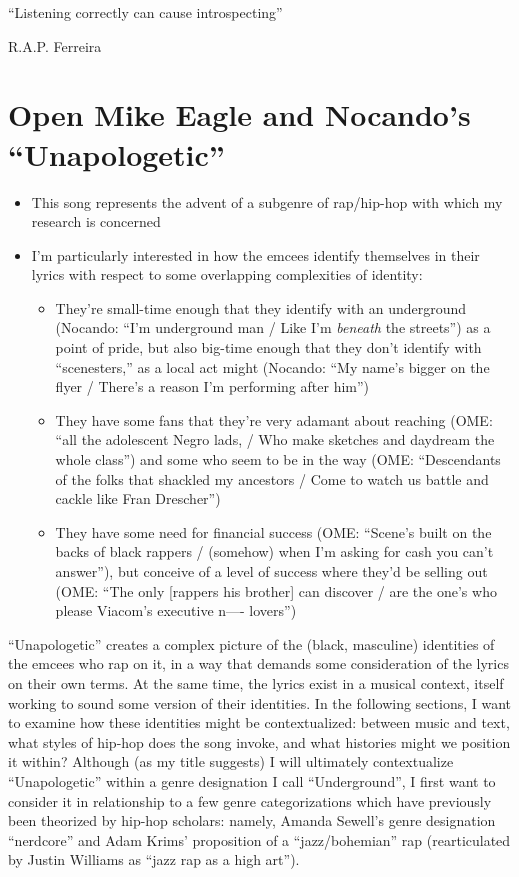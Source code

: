 \onehalfspacing

\epigraph{{``Listening correctly can cause introspecting''}}{R.A.P. Ferreira}

\section{Open Mike Eagle and Nocando's ``Unapologetic''}

\begin{itemize}
    \item This song represents the advent of a subgenre of rap/hip-hop with which my research is concerned
    \item I'm particularly interested in how the emcees identify themselves in their lyrics with respect to some 
    overlapping complexities of identity:
          \begin{itemize}
                \item They're small-time enough that they identify with an underground (Nocando: ``I'm underground man / Like 
                I'm  \emph{beneath} the streets'') as a point of pride, but also big-time enough that they don't identify with 
                ``scenesters,'' as a local act might (Nocando: ``My name's bigger on the flyer / There's a reason I'm performing
                after him'')
                \item They have some fans that they're very adamant about reaching (OME: ``all the adolescent Negro lads, / Who make 
                sketches and daydream the whole class'') and some who seem to be in the way (OME: ``Descendants of the folks that 
                shackled my ancestors / Come to watch us battle and cackle like Fran Drescher'')
                \item They have some need for financial success (OME: ``Scene's built on the backs of black rappers / (somehow) when
                I'm asking for cash you can't answer''), but conceive of a level of success where they'd be selling out (OME: ``The 
                only [rappers his brother] can discover / are the one's who please Viacom's executive n---- lovers'')
          \end{itemize}
\end{itemize}

``Unapologetic'' creates a complex picture of the (black, masculine) identities of the emcees who rap on it, in a way 
that demands some consideration of the lyrics on their own terms. At the same time, the lyrics exist in a musical context,
itself working to sound some version of their identities. In the following sections, I want to examine how these identities
might be contextualized: between music and text, what styles of hip-hop does the song invoke, and what histories might
we position it within? Although (as my title suggests) I will ultimately contextualize ``Unapologetic'' within a genre 
designation I call ``Underground'', I first want to consider it in relationship to a few genre categorizations which
have previously been theorized by hip-hop scholars: namely, Amanda Sewell's genre designation ``nerdcore'' and Adam Krims'
proposition of a ``jazz/bohemian'' rap (rearticulated by Justin Williams as ``jazz rap as a high art'').

